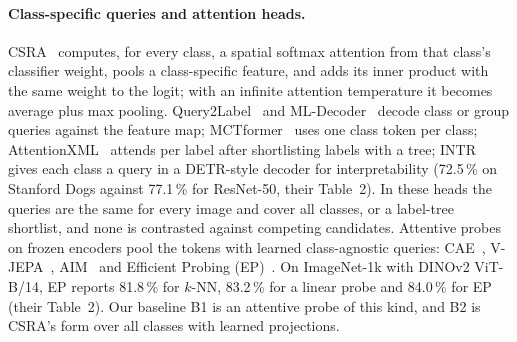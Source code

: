 \documentclass[11pt,a4paper]{article}
\theoremstyle{plain}
\begin{document}
\paragraph{Class-specific queries and attention heads.}
CSRA~\citep{zhu2021csra} computes, for every class, a spatial softmax attention from that class's classifier weight,
pools a class-specific feature, and adds its inner product with the same weight to the logit; with an infinite
attention temperature it becomes average plus max pooling. Query2Label~\citep{liu2021query2label} and
ML-Decoder~\citep{ridnik2023mldecoder} decode class or group queries against the feature map;
MCTformer~\citep{xu2022mctformer} uses one class token per class; AttentionXML~\citep{you2019attentionxml} attends per
label after shortlisting labels with a tree; INTR~\citep{paul2024intr} gives each class a query in a DETR-style
decoder for interpretability (72.5\,\% on Stanford Dogs against 77.1\,\% for ResNet-50, their Table~2). In these
heads the queries are the same for every image and cover all classes, or a label-tree shortlist, and none is
contrasted against competing candidates. Attentive probes on frozen encoders pool the tokens with learned
class-agnostic queries: CAE~\citep{chen2024cae}, V-JEPA~\citep{bardes2024vjepa}, AIM~\citep{elnouby2024aim} and
Efficient Probing (EP)~\citep{psomas2026efficientprobing}. On ImageNet-1k with DINOv2 ViT-B/14, EP reports 81.8\,\%
for $k$-NN, 83.2\,\% for a linear probe and 84.0\,\% for EP (their Table~2). Our baseline B1 is an attentive probe of
this kind, and B2 is CSRA's form over all classes with learned projections.
\end{document}
